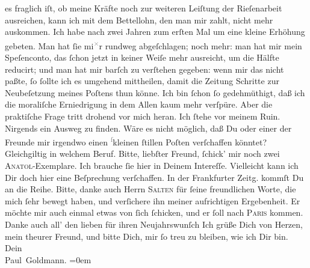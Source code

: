 \begin{ledgroupsized}[t]{13cm}
               es fraglich iſt, ob meine Kräfte noch zur weiteren Leiſtung der Rieſenarbeit
               ausreichen, kann ich mit dem Bettellohn, den man mir zahlt, nicht mehr auskommen. Ich
               habe nach zwei Jahren zum erſten Mal um eine kleine Erhöhung gebeten. Man hat ſie mi\substVorne{}\textsuperscript{\textcolor{gray}{×}}\substDazwischen{}r\substHinten{} rundweg abgeſchlagen; noch mehr: man hat mir mein Speſenconto, das ſchon
               jetzt in keiner Weiſe mehr ausreicht, um die Hälfte reducirt; und man hat mir barſch
                  {\pb}zu verſtehen gegeben: wenn mir das nicht paßte,
               ſo ſollte ich es umgehend mittheilen, damit die Zeitung Schritte zur Neubeſetzung meines Poſtens thun könne.
               Ich bin ſchon ſo gedehmüthigt, daß  ich die moraliſche Erniedrigung in dem Allen kaum mehr verſpüre. Aber die
               praktiſche Frage tritt drohend vor mich heran. Ich ſtehe vor meinem Ruin. Nirgends
               ein Ausweg zu finden. Wäre es nicht möglich, daß Du oder einer der Freunde mir
               irgendwo einen \substVorne{}\textsuperscript{\textcolor{gray}{ſ}}\substDazwischen{}k\substHinten{}leinen ſtillen Poſten verſchaffen könntet? Gleichgiltig in welchem Beruf.\pend
           \pstart
           {\pb}Bitte, liebſter Freund, ſchick’ mir noch zwei \textsc{Anatol}-Exemplare. Ich brauche ſie hier in Deinem Intereſſe. Vielleicht kann ich Dir
               doch hier eine Beſprechung verſchaffen. In der Frankfurter Zeitg. kommſt Du \label{K_L02605-1v}\label{K_L02605-1h} an die Reihe.\pend
           \pstart
           Bitte, danke auch Herrn \textsc{Salten} für ſeine freundlichen Worte, die mich ſehr bewegt haben, und verſichere ihn
               meiner aufrichtigen Ergebenheit. Er möchte mir auch einmal etwas {\pb}von ſich ſchicken, und er ſoll nach \textsc{Paris} kommen. Danke auch all’ den lieben \label{K_L02605-2v}\label{K_L02605-2h} für ihren Neujahrswunſch\pend
           \pstart
           Ich grüße Dich von Herzen, mein theurer Freund, und bitte Dich, mir ſo treu zu
               bleiben, wie ich Dir bin. {\\[\baselineskip]}Dein {\\[\baselineskip]}\spacefill\mbox{Paul Goldmann.}\pend
           \leftskip=0em{}
         
         \endnumbering{}\end{ledgroupsized}  \newcommand{\dateiname}{L02605}\newcommand{\titel}{Paul Goldmann an Arthur Schnitzler, 8. 1. [1894]}\newcommand{\editorInnen}{Martin Anton Müller und Laura Untner}
      